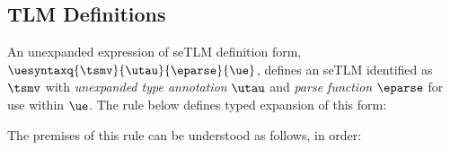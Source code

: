 \documentclass[acmsmall,10pt,review,anonymous]{acmart}\settopmatter{printfolios=true}
\begin{document}
\subsection{TLM Definitions}\label{sec:U-uetsm-definition}
An unexpanded expression of seTLM definition form, $\uesyntaxq{\tsmv}{\utau}{\eparse}{\ue}$, 
 defines an {seTLM} identified as $\tsmv$ with \emph{unexpanded type annotation} $\utau$ and \emph{parse function} $\eparse$ for use within $\ue$. The rule below defines typed expansion of this form:
\begin{mathpar}
\end{mathpar}
The premises of this rule can be understood as follows, in order:
\end{document}
